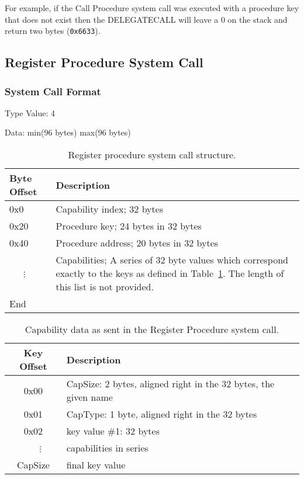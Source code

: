 \documentclass[english,a4paper]{article}
\let\oldparagraph\subsubsection
\renewcommand{\subsubsection}[1]{\oldparagraph{#1}\mbox{}}
\begin{document}
For example, if the Call
Procedure system call was executed with a procedure key that does not exist then
the DELEGATECALL will leave a 0 on the stack and return two bytes
(\texttt{0x6633}).

\subsection{Register Procedure System Call}

\subsubsection{System Call Format}
Type Value: 4

Data: min(96 bytes) max(96 bytes)

\begin{table}[H]
  \caption{Register procedure system call structure.}
  \centering{}%
  \begin{tabular}{l|p{}}
    \hline
    Byte Offset & Description\tabularnewline
    \hline
    \hline
    0x0 & Capability index; 32 bytes \tabularnewline
    0x20 & Procedure key; 24 bytes in 32 bytes \tabularnewline
    0x40 & Procedure address; 20 bytes in 32 bytes \tabularnewline
    ~~~$\vdots$ & Capabilities; A series of 32 byte values which correspond
    exactly to the keys as defined in Table~\ref{reg-cap-format}. The length of
    this list is not provided. \tabularnewline
    \hline
    End &  \tabularnewline
    \hline
  \end{tabular}
\end{table}

\begin{table}[H]
  \caption{Capability data as sent in the Register Procedure system call.\label{reg-cap-format}}
  \centering{}%
  \begin{tabularx}{\textwidth}{c|X}
    \hline
    Key Offset & Description \\
    \hline
    \hline
    0x00       & CapSize: 2 bytes, aligned right in the 32 bytes, the given
      name \\
    0x01       & CapType: 1 byte, aligned right in the 32 bytes \\
    0x02       & key value \#1: 32 bytes \\
    ~~~$\vdots$ & capabilities in series \\
    CapSize & final key value \\
    \hline
  \end{tabularx}
\end{table}
\end{document}
